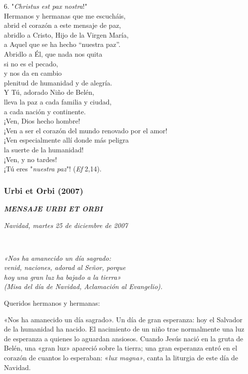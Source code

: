 6. "\emph{Christus est pax nostra}!"\\
Hermanos y hermanas que me escucháis,\\
abrid el corazón a este mensaje de paz,\\
abridlo a Cristo, Hijo de la Virgen María,\\
a Aquel que se ha hecho ``nuestra paz''.\\
Abridlo a Él, que nada nos quita\\
si no es el pecado,\\
y nos da en cambio\\
plenitud de humanidad y de alegría.\\
Y Tú, adorado Niño de Belén,\\
lleva la paz a cada familia y ciudad,\\
a cada nación y continente.\\
¡Ven, Dios hecho hombre!\\
¡Ven a ser el corazón del mundo renovado por el amor!\\
¡Ven especialmente allí donde más peligra\\
la suerte de la humanidad!\\
¡Ven, y no tardes!\\
¡Tú eres "\emph{nuestra paz}"! (\emph{Ef} 2,14).

\subsubsection{Urbi et Orbi (2007)}
\textbf{\emph{MENSAJE URBI ET ORBI}}

\emph{Navidad, martes 25 de diciembre de 2007}

~

\emph{«Nos ha amanecido un día sagrado:\\
	venid, naciones, adorad al Señor, porque\\
	hoy una gran luz ha bajado a la tierra»\\
	(Misa del día de Navidad, Aclamación al Evangelio).}

Queridos hermanos y hermanas:

«Nos ha amanecido un día sagrado». Un día de gran esperanza: hoy el
Salvador de la humanidad ha nacido. El nacimiento de un niño trae
normalmente una luz de esperanza a quienes lo aguardan ansiosos. Cuando
Jesús nació en la gruta de Belén, una «gran luz» apareció sobre la
tierra; una gran esperanza entró en el corazón de cuantos lo esperaban:
«\emph{lux magna»}, canta la liturgia de este día de Navidad.

